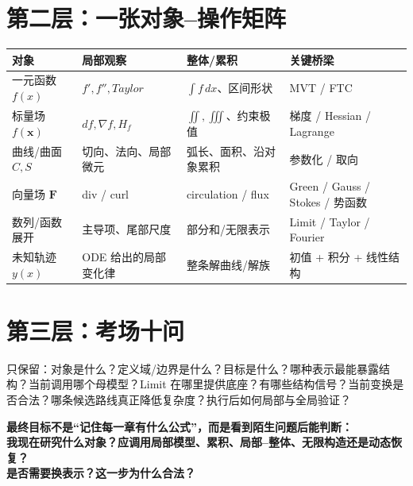 \documentclass[11pt,a4paper,openany]{ctexbook}
\begin{document}
\section{第二层：一张对象--操作矩阵}
\begin{longtable}{L{2.6cm}L{3.6cm}L{3.6cm}L{\dimexpr\linewidth-10.17cm\relax}}
\toprule
\textbf{对象} & \textbf{局部观察} & \textbf{整体/累积} & \textbf{关键桥梁}\\
\midrule
一元函数 $f(x)$ & $f',f'',Taylor$ & $\int f\,dx$、区间形状 & MVT / FTC\\
标量场 $f(\bm x)$ & $df,\nabla f,H_f$ & $\iint,\iiint$、约束极值 & 梯度 / Hessian / Lagrange\\
曲线/曲面 $C,S$ & 切向、法向、局部微元 & 弧长、面积、沿对象累积 & 参数化 / 取向\\
向量场 $\bm F$ & div / curl & circulation / flux & Green / Gauss / Stokes / 势函数\\
数列/函数展开 & 主导项、尾部尺度 & 部分和/无限表示 & Limit / Taylor / Fourier\\
未知轨迹 $y(x)$ & ODE 给出的局部变化律 & 整条解曲线/解族 & 初值 + 积分 + 线性结构\\
\bottomrule
\end{longtable}

\section{第三层：考场十问}
只保留：对象是什么？定义域/边界是什么？目标是什么？哪种表示最能暴露结构？当前调用哪个母模型？Limit 在哪里提供底座？有哪些结构信号？当前变换是否合法？哪条候选路线真正降低复杂度？执行后如何局部与全局验证？

\begin{center}
\Large\bfseries\color{deep}
最终目标不是“记住每一章有什么公式”，而是看到陌生问题后能判断：\\[0.4em]
我现在研究什么对象？应调用局部模型、累积、局部--整体、无限构造还是动态恢复？\\
是否需要换表示？这一步为什么合法？
\end{center}
\end{document}
